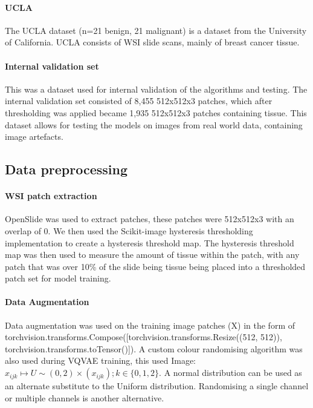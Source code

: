 \documentclass[review]{elsarticle}
\begin{document}
\paragraph{UCLA} The UCLA dataset (n=21 benign, 21 malignant) is a dataset from the University of California. UCLA consists of WSI slide scans, mainly of breast cancer tissue.

\paragraph{Internal validation set} This was a dataset used for internal validation of the algorithms and testing. The internal validation set consisted of 8,455 512x512x3 patches, which after thresholding was applied became 1,935 512x512x3 patches containing tissue. This dataset allows for testing the models on images from real world data, containing image artefacts.

\subsection{Data preprocessing}
\paragraph{WSI patch extraction} OpenSlide was used to extract patches, these patches were 512x512x3 with an overlap of 0. We then used the Scikit-image hysteresis thresholding implementation to create a hysteresis threshold map. The hysteresis threshold map was then used to measure the amount of tissue within the patch, with any patch that was over 10\% of the slide being tissue being placed into a thresholded patch set for model training.

\paragraph{Data Augmentation} Data augmentation was used on the training image patches (X) in the form of torchvision.transforms.Compose([torchvision.transforms.Resize((512, 512)), torchvision.transforms.toTensor()]). A custom colour randomising algorithm was also used during VQVAE training, this used Image:$x_{ijk}\mapsto U\sim(0,2) \times (x_{ijk}); k\in \{0,1,2\}$. A normal distribution can be used as an alternate substitute to the Uniform distribution. Randomising a single channel or multiple channels is another alternative.
\end{document}
